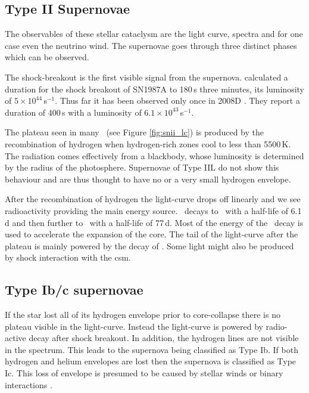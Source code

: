 \subsection{Type II Supernovae}
The observables of these stellar cataclysm are the light curve, spectra and for one case even the neutrino wind. The supernovae goes through three distinct phases which can be observed. 

The shock-breakout is the first visible signal from the supernova.  \cite{1992ApJ...393..742E} calculated a duration for the  shock breakout of SN1987A to 180\,s three minutes, its  luminosity of $5\times10^{44}$\erg\,s$^{-1}$. 
Thus far it has been observed only once in 2008D \citep{2008Natur.453..469S}. They report a duration of 400\,s with a luminosity of $6.1\times10^{43}$\erg\,s$^{-1}$.

The plateau seen in many \snii\ (see Figure \ref{fig:snii_lc}) is produced by the recombination of hydrogen when hydrogen-rich zones cool to less than 5500\,K. The radiation comes effectively from a blackbody, whose luminosity is determined  by the radius of the photosphere.
Supernovae of Type IIL do not show this behaviour and are thus thought to have no or a very small hydrogen envelope.


After the recombination of hydrogen the light-curve drops off linearly and we see radioactivity providing the main energy source. \Ni\ decays to \Co\ with a half-life of 6.1\,d and then further to \Fe\ with a half-life of 77\,d. Most of the energy of the \Ni\ decay is used to accelerate the expansion of the core. The tail of the light-curve after the plateau is mainly powered by the decay of \Co. Some light might also be produced by shock interaction with the \gls{csm}.





\subsection{Type Ib/c supernovae}
If the star lost all of its hydrogen envelope prior to core-collapse there is no plateau visible in the light-curve. Instead the light-curve is powered by radio-active decay after shock breakout. In addition, the hydrogen lines are not visible in the spectrum. This leads to the supernova being classified as Type Ib. If both hydrogen and helium envelopes are lost then the supernova is classified as Type Ic. 
This loss of envelope is presumed to be caused by stellar winds or binary interactions \citep{1992ApJ...391..246P}. 


